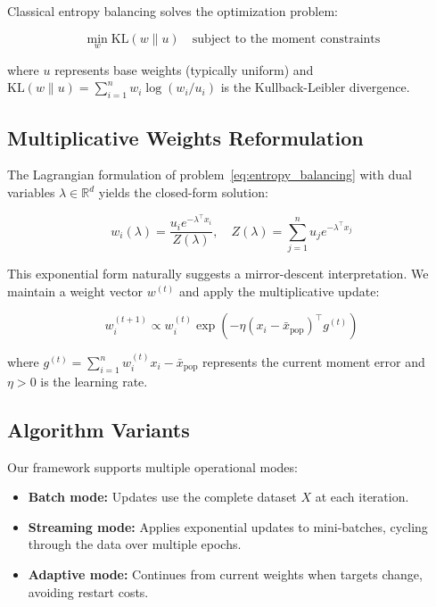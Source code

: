 \documentclass[12pt, letterpaper]{article}
\begin{document}
Classical entropy balancing solves the optimization problem:

\begin{equation}
\min_{w} \text{KL}(w \| u) \quad \text{subject to the moment constraints}
\tag{EB}
\label{eq:entropy_balancing}
\end{equation}

where $u$ represents base weights (typically uniform) and $\text{KL}(w \| u) = \sum_{i=1}^n w_i \log(w_i/u_i)$ is the Kullback-Leibler divergence.

\subsection{Multiplicative Weights Reformulation}

The Lagrangian formulation of problem~\eqref{eq:entropy_balancing} with dual variables $\lambda \in \mathbb{R}^d$ yields the closed-form solution:

\begin{equation}
w_i(\lambda) = \frac{u_i e^{-\lambda^{\top} x_i}}{Z(\lambda)}, \quad Z(\lambda) = \sum_{j=1}^n u_j e^{-\lambda^{\top} x_j}
\label{eq:lagrangian_solution}
\end{equation}

This exponential form naturally suggests a mirror-descent interpretation. We maintain a weight vector $w^{(t)}$ and apply the multiplicative update:

\begin{equation}
w^{(t+1)}_i \propto w^{(t)}_i \exp\left(-\eta \left(x_i - \bar{x}_{\text{pop}}\right)^{\top} g^{(t)}\right)
\tag{MWU}
\label{eq:mwu_update}
\end{equation}

where $g^{(t)} = \sum_{i=1}^n w^{(t)}_i x_i - \bar{x}_{\text{pop}}$ represents the current moment error and $\eta > 0$ is the learning rate.

\subsection{Algorithm Variants}

Our framework supports multiple operational modes:

\begin{itemize}
\item \textbf{Batch mode:} Updates use the complete dataset $X$ at each iteration.
\item \textbf{Streaming mode:} Applies exponential updates to mini-batches, cycling through the data over multiple epochs.
\item \textbf{Adaptive mode:} Continues from current weights when targets change, avoiding restart costs.
\end{itemize}
\end{document}
